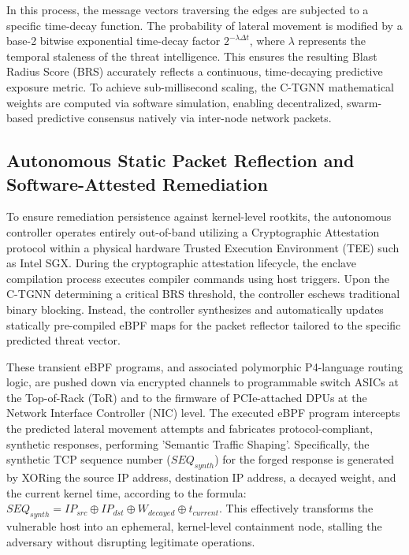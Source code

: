 \documentclass[12pt, letterpaper]{article}
\begin{document}
In this process, the message vectors traversing the edges are subjected to a specific time-decay function. The probability of lateral movement is modified by a base-2 bitwise exponential time-decay factor $2^{-\lambda \Delta t}$, where $\lambda$ represents the temporal staleness of the threat intelligence. This ensures the resulting Blast Radius Score (BRS) accurately reflects a continuous, time-decaying predictive exposure metric. To achieve sub-millisecond scaling, the C-TGNN mathematical weights are computed via software simulation, enabling decentralized, swarm-based predictive consensus natively via inter-node network packets.

\subsection{Autonomous Static Packet Reflection and Software-Attested Remediation}
To ensure remediation persistence against kernel-level rootkits, the autonomous controller operates entirely out-of-band utilizing a Cryptographic Attestation protocol within a physical hardware Trusted Execution Environment (TEE) such as Intel SGX. During the cryptographic attestation lifecycle, the enclave compilation process executes compiler commands using host triggers. Upon the C-TGNN determining a critical BRS threshold, the controller eschews traditional binary blocking. Instead, the controller synthesizes and automatically updates statically pre-compiled eBPF maps for the packet reflector tailored to the specific predicted threat vector. 

These transient eBPF programs, and associated polymorphic P4-language routing logic, are pushed down via encrypted channels to programmable switch ASICs at the Top-of-Rack (ToR) and to the firmware of PCIe-attached DPUs at the Network Interface Controller (NIC) level. The executed eBPF program intercepts the predicted lateral movement attempts and fabricates protocol-compliant, synthetic responses, performing 'Semantic Traffic Shaping'. Specifically, the synthetic TCP sequence number ($\mathit{SEQ}_{\mathit{synth}}$) for the forged response is generated by XORing the source IP address, destination IP address, a decayed weight, and the current kernel time, according to the formula: $\mathit{SEQ}_{\mathit{synth}} = \mathit{IP}_{\mathit{src}} \oplus \mathit{IP}_{\mathit{dst}} \oplus W_{\mathit{decayed}} \oplus t_{\mathit{current}}$. This effectively transforms the vulnerable host into an ephemeral, kernel-level containment node, stalling the adversary without disrupting legitimate operations.
\end{document}

